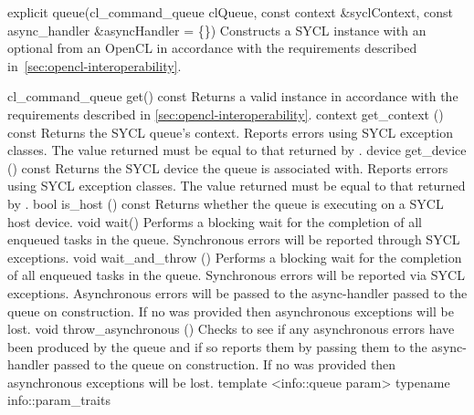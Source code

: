   \addRowThreeL
    { explicit queue(cl_command_queue clQueue,}
    { const context \&syclContext, }
    { const async_handler \&asyncHandler = \{\}) }
    {
      Constructs a SYCL  instance with an optional
       from an OpenCL 
      in accordance with the requirements described
      in~\ref{sec:opencl-interoperability}.
    }
\completeInfoTable

  \addRow
    {cl_command_queue get() const}
    {   
      Returns a valid  instance in accordance with the requirements described in \ref{sec:opencl-interoperability}.    
    }
  \addRow
    {context get_context () const}
    {
      Returns the SYCL queue's context.
      Reports errors using SYCL exception classes.
      The value returned must be equal to that returned by .
    }
  \addRow
    {device get_device () const}
    {
      Returns the SYCL device the queue is associated with.
      Reports errors using SYCL exception classes.
      The value returned must be equal to that returned by .
    }
  \addRow
   {bool is_host () const}
   {
      Returns whether the queue is executing on a SYCL host device.
   }
  \addRow
    {void wait() }
    {
      Performs a blocking wait for the completion of all enqueued tasks
      in the queue.  Synchronous errors will be reported through SYCL
      exceptions.
    }
  \addRow
    {void wait_and_throw () }
    {
      Performs a blocking wait for the completion of all enqueued tasks
      in the queue.  Synchronous errors will be reported via SYCL
      exceptions. Asynchronous errors will be passed to the
      \gls{async-handler} passed to the queue on
      construction. If no  was provided then
      asynchronous exceptions will be lost.
    }
  \addRow
    {void throw_asynchronous () }
    {
      Checks to see if any asynchronous errors have been produced by
      the queue and if so reports them by passing them to the
      \gls{async-handler} passed to the queue on
      construction. If no  was provided then
      asynchronous exceptions will be lost.
    }
  \addRowFourL
    { template <info::queue param> }
    {  typename info::param_traits}
